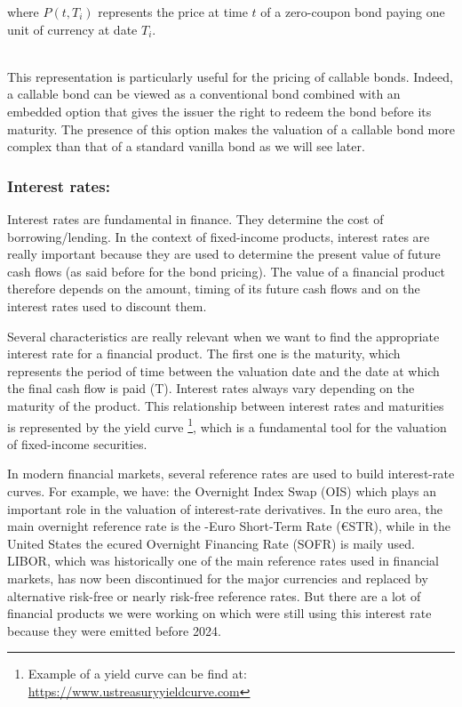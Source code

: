 \documentclass{article}
\begin{document}
where $P(t,T_i)$ represents the price at time $t$ of a zero-coupon bond paying one unit of currency at date $T_i$.

\\

This representation is particularly useful for the pricing of callable bonds. Indeed, a callable bond can be viewed as a conventional bond combined with an embedded option that gives the issuer the right to redeem the bond before its maturity. The presence of this option makes the valuation of a callable bond more complex than that of a standard vanilla bond as we will see later.
\\

\subsubsection{Interest rates:}

Interest rates are fundamental in finance. They determine the cost of borrowing/lending. In the context of fixed-income products, interest rates are really important because they are used to determine the present value of future cash flows (as said before for the bond pricing). The value of a financial product therefore depends on the amount, timing of its future cash flows and on the interest rates used to discount them.


Several characteristics are really relevant when we want to find the appropriate interest rate for a financial product. The first one is the maturity, which represents the period of time between the valuation date and the date at which the final cash flow is paid (T). Interest rates always vary depending on the maturity of the product. This relationship between interest rates and maturities is represented by the yield curve \footnote{Example of a yield curve can be find at: \url{https://www.ustreasuryyieldcurve.com}}, which is a fundamental tool for the valuation of fixed-income securities.

In modern financial markets, several reference rates are used to build interest-rate curves. For example, we have: the Overnight Index Swap (OIS) which plays an important role in the valuation of interest-rate derivatives. In the euro area, the main overnight reference rate is the -Euro Short-Term Rate (€STR), while in the United States the ecured Overnight Financing Rate (SOFR) is maily used. LIBOR, which was historically one of the main reference rates used in financial markets, has now been discontinued for the major currencies and replaced by alternative risk-free or nearly risk-free reference rates. But there are a lot of financial products we were working on which were still using this interest rate because they were emitted before 2024.
\end{document}

